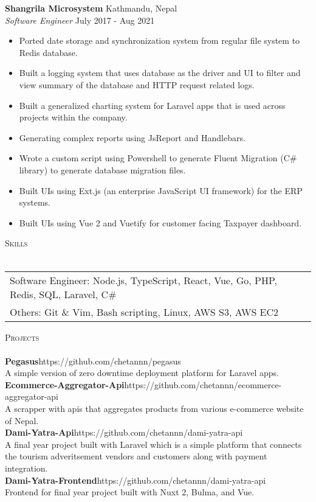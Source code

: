 \documentclass[a4paper]{article}
\newcommand{\lineunder} {
    \vspace*{-8pt} \\
    \hspace*{-18pt} \hrulefill \\
}
\newcommand{\header} [1] {
    {\hspace*{-18pt}\vspace*{6pt} \textsc{#1}}
    \vspace*{-6pt} \lineunder
}
\begin{document}
\textbf{Shangrila Microsystem} \hfill Kathmandu, Nepal\\
\textit{Software Engineer} \hfill July 2017 - Aug 2021\\
\vspace{-1mm}
\begin{itemize} \itemsep 1pt
	\item Ported date storage and synchronization system from regular file system to Redis database.
	\item Built a logging system that uses database as the driver and UI to filter and view summary of the database and HTTP request related logs.
	\item Built a generalized charting system for Laravel apps that is used across projects within the company.
	\item Generating complex reports using JsReport and Handlebars.
	\item Wrote a custom script using Powershell to generate Fluent Migration (C\# library) to generate database migration files.
	\item Built UIs using Ext.js (an enterprise JavaScript UI framework) for the ERP systems.
	\item Built UIs using Vue 2 and Vuetify for customer facing Taxpayer dashboard.
\end{itemize}


\header{Skills}
\begin{tabularx}{\textwidth}{ l X } 
	Software Engineer:  Node.js, TypeScript, React, Vue, Go, PHP, Redis, SQL, Laravel, C\#      \\
	Others:       Git \& Vim, Bash scripting, Linux, AWS S3, AWS EC2  \\
\end{tabularx}
\vspace{2mm}

\header{Projects}
{\textbf{Pegasus}}\hfill https://github.com/chetannn/pegasus\\
A simple version of zero downtime deployment platform for Laravel apps.\\
\vspace*{2mm}
{\textbf{Ecommerce-Aggregator-Api}}\hfill https://github.com/chetannn/ecommerce-aggregator-api\\
A scrapper with apis that aggregates products from various e-commerce website of Nepal.\\
\vspace*{2mm}
{\textbf{Dami-Yatra-Api}}\hfill https://github.com/chetannn/dami-yatra-api\\
A final year project built with Laravel which is a simple platform that connects the tourism adveritsement vendors and customers along with payment integration.\\
\vspace*{2mm}
{\textbf{Dami-Yatra-Frontend}}\hfill https://github.com/chetannn/dami-yatra-api\\
Frontend for final year project built with Nuxt 2, Bulma, and Vue.\\
\vspace*{2mm}
\ 
\end{document}
